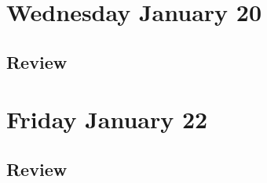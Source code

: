 

\section*{Wednesday January 20}
% 
%
%
%
%
%
%
%
%
% 
% 

\newpage
\subsection*{Review}

\newpage

\section*{Friday January 22}
% 
% 
% 
\newpage
% 
\newpage

\subsection*{Review}


